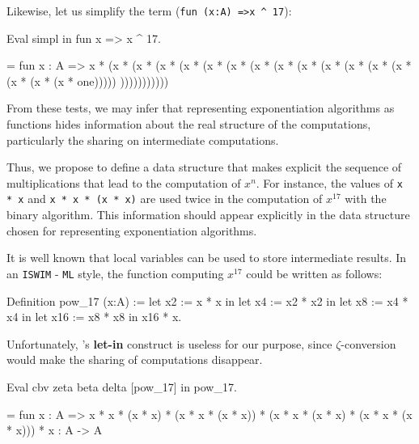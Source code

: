 Likewise, let us simplify the term (\Verb|fun (x:A) =>x ^ 17|):

\begin{Coqsrc}
Eval simpl in   fun x =>  x ^ 17.  
\end{Coqsrc}

\begin{Coqanswer}
= fun x : A =>
   x * (x *  (x *  (x *  (x *   (x *  (x *  (x *
    (x * (x * (x * (x * (x * (x * (x * (x * (x * one)))))
  )))))))))))  
\end{Coqanswer}


From these tests, we may infer that  representing exponentiation algorithms as \coq{}  functions hides
information about the real structure of the computations, particularly the sharing on intermediate computations.

Thus, we propose to define a data structure that makes explicit the sequence of multiplications that lead to the computation of $x^n$. For instance, the values of  
\texttt{x * x} and
\texttt{x * x * (x * x)}  are used
twice in the  computation of $x^{17}$ with the binary algorithm. This information should 
appear explicitly in the data structure chosen for representing exponentiation 
algorithms.

It is well known that local variables can be used to store intermediate results.
In an \texttt{ISWIM} - \texttt{ML} style, the function computing $x^{17}$ could be written as follows:

\begin{Coqsrc}
Definition pow_17  (x:A) :=
  let x2 := x * x in
  let x4 := x2 * x2 in
  let x8 := x4 * x4 in
  let x16 := x8 * x8 in
  x16 * x.
\end{Coqsrc}
\label{pow-17-let-in}

Unfortunately, \coq's \textbf{let-in} construct is useless for our purpose, since $\zeta$-conversion 
would make the sharing of computations disappear.

\begin{Coqsrc}
Eval cbv  zeta beta delta [pow_17]  in  pow_17.
\end{Coqsrc}

\begin{Coqanswer}
 = fun x : A =>
       x * x * (x * x) * (x * x * (x * x)) *
       (x * x * (x * x) * (x * x * (x * x))) * x
     : A -> A 
\end{Coqanswer}
                                                                                                                                                                                                                                                                                                                                                                                                                                                                                                                                                                                                                                                                                                                                                                                                                                   
